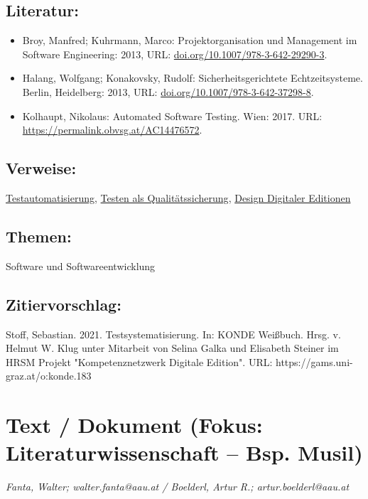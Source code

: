 \documentclass{article}
\begin{document}
        \subsection*{Literatur:}\begin{itemize}\item Broy, Manfred; Kuhrmann, Marco: Projektorganisation und Management im Software Engineering: 2013, URL: \url{doi.org/10.1007/978-3-642-29290-3}.\item Halang, Wolfgang; Konakovsky, Rudolf: Sicherheitsgerichtete Echtzeitsysteme. Berlin, Heidelberg: 2013, URL: \url{doi.org/10.1007/978-3-642-37298-8}.\item Kolhaupt, Nikolaus: Automated Software Testing. Wien: 2017. URL: \url{https://permalink.obvsg.at/AC14476572}.\end{itemize}\subsection*{Verweise:}\href{https://gams.uni-graz.at/o:konde.181}{Testautomatisierung}, \href{https://gams.uni-graz.at/o:konde.182}{Testen als Qualitätssicherung}, \href{https://gams.uni-graz.at/o:konde.56}{Design Digitaler Editionen}\subsection*{Themen:}Software und Softwareentwicklung\subsection*{Zitiervorschlag:}Stoff, Sebastian. 2021. Testsystematisierung. In: KONDE Weißbuch. Hrsg. v. Helmut W. Klug unter Mitarbeit von Selina Galka und Elisabeth Steiner im HRSM Projekt "Kompetenznetzwerk Digitale Edition". URL: https://gams.uni-graz.at/o:konde.183\newpage\section*{Text / Dokument (Fokus: Literaturwissenschaft – Bsp. Musil)} \emph{Fanta, Walter; walter.fanta@aau.at / Boelderl, Artur R.;
                  artur.boelderl@aau.at}\\
        
\end{document}
